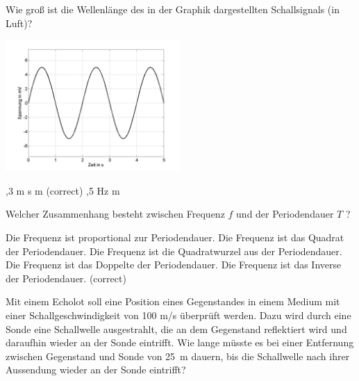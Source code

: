 \documentclass[11pt]{exam}
\begin{document}
\setlength{\voffset}{-0.5in}
\setlength{\headsep}{5pt}

\hspace{2mm}
 \hspace{5mm}
\vspace{4mm}

\begin{questions}

\question Wie groß ist die Wellenlänge des in der Graphik dargestellten Schallsignals (in Luft)? 

\includegraphics[width=0.5\textwidth]{../../../questions/J/images/SchallSinus2.png}

\begin{choices}
	,3 m
	 s
	 m (correct)
	,5 Hz
	 m
\end{choices}

\vspace{3mm}\question Welcher Zusammenhang besteht zwischen Frequenz \( f \) und der Periodendauer \( T \) ?

\begin{choices}
	\choice Die Frequenz ist proportional zur Periodendauer.
	\choice Die Frequenz ist das Quadrat der Periodendauer.
	\choice Die Frequenz ist die Quadratwurzel aus der Periodendauer.
	\choice Die Frequenz ist das Doppelte der Periodendauer.
	\choice Die Frequenz ist das Inverse der Periodendauer. (correct)
\end{choices}

\vspace{3mm}\question Mit einem Echolot soll eine Position eines Gegenstandes in einem Medium mit einer Schallgeschwindigkeit von 100 m/s überprüft werden. Dazu wird durch eine Sonde eine Schallwelle ausgestrahlt, die an dem Gegenstand reflektiert wird und daraufhin wieder an der Sonde eintrifft. Wie lange müsste es bei einer Entfernung zwischen Gegenstand und Sonde von 25~m dauern, bis die Schallwelle nach ihrer Aussendung wieder an der Sonde eintrifft?


\end{questions}
\end{document}
